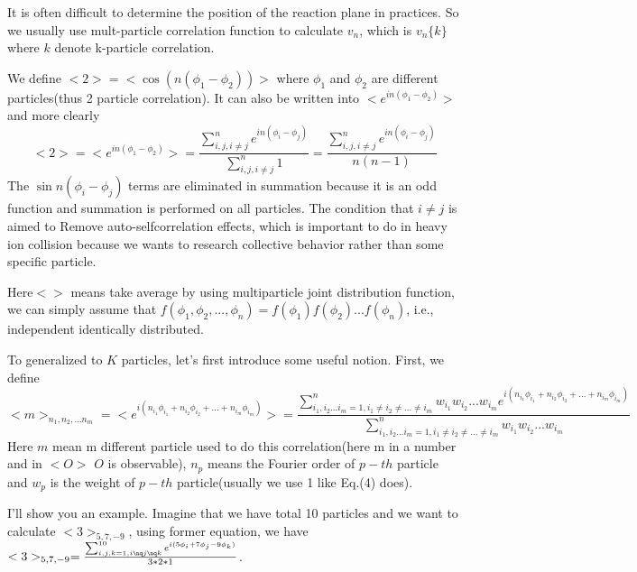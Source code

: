 \documentclass{article}
\begin{document}
\quad It is often difficult to determine the position of the reaction plane in practices. So we usually use mult-particle correlation function to calculate $v_n$, which is $v_n\{k\}$ where $k$ denote k-particle correlation.

\quad We define $<2> = <\cos(n(\phi_1 - \phi_2))>$ where $\phi_1$ and $\phi_2$ are different particles(thus 2 particle correlation). It can also be written into  $<e^{in(\phi_1-\phi_2)}>$ and more clearly
\begin{equation}
    <2>= <e^{in(\phi_1-\phi_2)}> = \frac{\sum_{i,j,i\neq j}^{n} e^{in(\phi_i-\phi_j)}}{\sum_{i,j,i\neq j}^{n} 1} = \frac{\sum_{i,j,i\neq j}^{n} e^{in(\phi_i-\phi_j)}}{n(n-1)}
\end{equation}
The $\sin n(\phi_i-\phi_j)$ terms are eliminated in summation because it is an odd function and summation is performed on all particles. The condition that $i\neq j$ is aimed to Remove auto-selfcorrelation effects, which is important to do in heavy ion collision because we wants to research collective behavior rather than some specific particle.

\quad Here$<>$ means take average by using multiparticle joint distribution function, we can simply assume that $f(\phi_1,\phi_2,...,\phi_n)=f(\phi_1)f(\phi_2)...f(\phi_n)$, i.e., independent identically distributed.

\quad To generalized to $K$ particles, let's first introduce some useful notion. First, we define 
\begin{equation}
    <m>_{n_1,n_2,...n_m} = <e^{i(n_i_{1}\phi_i_{1}+n_i_{2}\phi_i_{2}+...+n_i_{m}\phi_i_{m})}> = \frac{ \sum_{i_{1},i_{2}...i_{m} = 1, i_1\neq i_2\neq ...\neq i_m}^{n}w_{i_1}w_{i_2}...w_{i_m}e^{i(n_{i_1}\phi_{i_1}+n_{i_2}\phi_{i_2}+...+n_{i_m}\phi_{i_m})}}{\sum_{i_1,i_2...i_m = 1, i_1\neq i_2\neq ...\neq i_m}^{n}w_{i_1}w_{i_2}...w_{i_m}}
\end{equation}
Here $m$ mean m different particle used to do this correlation(here m in a number and in $<O>$ $O$ is observable), $n_p$ means the Fourier order of $p-th$ particle and $w_p$ is the weight of $p-th$ particle(usually we use 1 like Eq.(4) does).

\quad I'll show you an example. Imagine that we have total 10 particles and we want to calculate $<3>_{5,7,-9}$, using former equation, we have $<3>_{5,7,-9} = \frac{\sum_{i,j,k=1,i\nq j \nq k}^{10} e^{i(5 \phi_{i}+7 \phi_{j} - 9 \phi_{k})}}{3*2*1}$.
\end{document}
